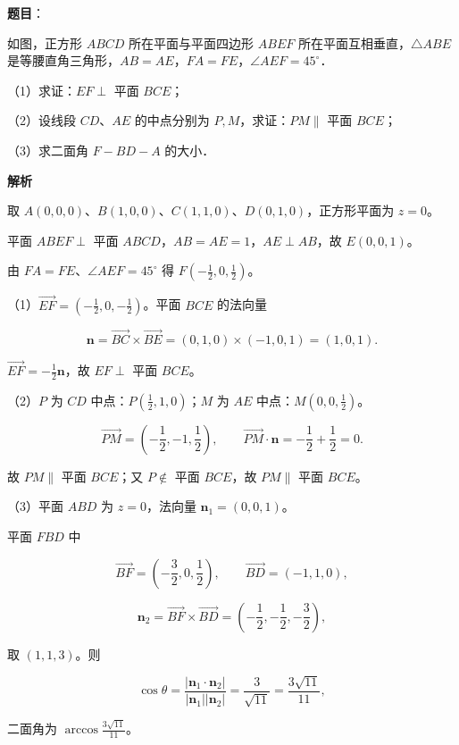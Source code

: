 \begin{answer}

\textbf{题目}：

如图，正方形 $ABCD$ 所在平面与平面四边形 $ABEF$ 所在平面互相垂直，$\triangle ABE$ 是等腰直角三角形，$AB=AE$，$FA=FE$，$\angle AEF=45^\circ$．
\nopagebreak[4]
\begin{center}\end{center}
\nopagebreak[4]
（1）求证：$EF\perp$ 平面 $BCE$；

（2）设线段 $CD$、$AE$ 的中点分别为 $P,M$，求证：$PM\parallel$ 平面 $BCE$；

（3）求二面角 $F-BD-A$ 的大小．

\textbf{解析}

取 $A(0,0,0)$、$B(1,0,0)$、$C(1,1,0)$、$D(0,1,0)$，正方形平面为 $z=0$。

平面 $ABEF\perp$ 平面 $ABCD$，$AB=AE=1$，$AE\perp AB$，故 $E(0,0,1)$。

由 $FA=FE$、$\angle AEF=45^\circ$ 得 $F\left(-\frac12,0,\frac12\right)$。

（1）$\overrightarrow{EF}=\left(-\frac12,0,-\frac12\right)$。平面 $BCE$ 的法向量

\nopagebreak[4]
\[\mathbf n=\overrightarrow{BC}\times\overrightarrow{BE}
=(0,1,0)\times(-1,0,1)=(1,0,1).\]

$\overrightarrow{EF}=-\frac12\mathbf n$，故 $EF\perp$ 平面 $BCE$。

（2）$P$ 为 $CD$ 中点：$P\left(\frac12,1,0\right)$；$M$ 为 $AE$ 中点：$M\left(0,0,\frac12\right)$。

\nopagebreak[4]
\[\overrightarrow{PM}=\left(-\frac12,-1,\frac12\right),\qquad
\overrightarrow{PM}\cdot\mathbf n=-\frac12+\frac12=0 .\]

故 $PM\parallel$ 平面 $BCE$；又 $P\notin$ 平面 $BCE$，故 $PM\parallel$ 平面 $BCE$。

（3）平面 $ABD$ 为 $z=0$，法向量 $\mathbf n_1=(0,0,1)$。

平面 $FBD$ 中

\nopagebreak[4]
\[\overrightarrow{BF}=\left(-\frac32,0,\frac12\right),\qquad
\overrightarrow{BD}=(-1,1,0),\]

\nopagebreak[4]
\[\mathbf n_2=\overrightarrow{BF}\times\overrightarrow{BD}
=\left(-\frac12,-\frac12,-\frac32\right),\]

取 $(1,1,3)$。则

\nopagebreak[4]
\[\cos\theta=\frac{|\mathbf n_1\cdot\mathbf n_2|}{|\mathbf n_1||\mathbf n_2|}
=\frac{3}{\sqrt{11}}=\frac{3\sqrt{11}}{11},\]

二面角为 $\arccos\frac{3\sqrt{11}}{11}$。


\end{answer}
